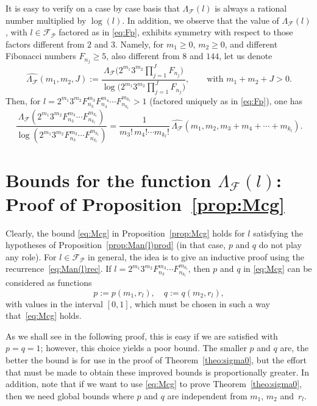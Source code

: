 \documentclass[11pt, a4paper]{article}
\newcommand{\manF}{\Lambda_{\mathcal{F}}}
\newcommand{\Fp}{\mathcal{F}_{\mathcal{P}}}
\theoremstyle{plain}
\theoremstyle{definition}
\begin{document}
It is easy to verify on a case by case basis that $\manF(l)$ is always a rational number multiplied by $\log(l)$. In addition, we observe that the value of $\manF(l)$, with $l \in \Fp$ factored as in \eqref{eq:Fp}, exhibits symmetry with respect to those factors different from $2$ and $3$. Namely, for $m_1 \ge 0$, $m_2 \ge 0$, and different Fibonacci numbers $F_{n_j}\ge 5$, also different from $8$ and $144$, let us denote
\begin{equation*}
\widehat{\manF}(m_1,m_2,J) := 
\frac{\manF\Big(2^{m_1} 3^{m_2} \prod_{j=1}^{J} F_{n_j}\Big)}
  {\log\Big(2^{m_1} 3^{m_2} \prod_{j=1}^{J} F_{n_j}\Big)},
\qquad\text{with } m_1+m_2+J>0.
\end{equation*}
Then, for $l=2^{m_1} 3^{m_2} F_{n_3}^{m_3} F_{n_4}^{m_4} \cdots F_{n_{k_l}}^{m_{k_l}} > 1$ (factored uniquely as in \eqref{eq:Fp}), one has
\[
  \frac{\manF(2^{m_1} 3^{m_2} F_{n_3}^{m_3} \cdots F_{n_{k_l}}^{m_{k_l}})}
    {\log(2^{m_1} 3^{m_2} F_{n_3}^{m_3} \cdots F_{n_{k_l}}^{m_{k_l}})}
  = \frac{1}{m_3!\,m_4!\cdots m_{k_l}!} 
  \, \widehat{\manF}(m_1,m_2,m_3+m_4+\cdots+m_{k_l}).
\]

\section{Bounds for the function $\manF(l)$: Proof of Proposition~\ref{prop:Mcg}}

Clearly, the bound \eqref{eq:Mcg} in Proposition~\ref{prop:Mcg} holds for $l$ satisfying the hypotheses of Proposition~\ref{prop:Man(l)prod} (in that case, $p$ and $q$ do not play any role). For $l \in \Fp$ in general, the idea is to give an inductive proof using the recurrence~\eqref{eq:Man(l)rec}. If $l = 2^{m_1}3^{m_2}F_{n_3}^{m_3} \cdots F_{n_{k_l}}^{m_{k_l}}$, then $p$ and $q$ in \eqref{eq:Mcg} can be considered as functions
\[
  p := p(m_1,r_l),\quad q := q(m_2,r_l),
\]
with values in the interval $[0,1]$, which must be chosen in such a way that~\eqref{eq:Mcg} holds.

As we shall see in the following proof, this is easy if we are satisfied with $p = q = 1$; however, this choice yields a poor bound. The smaller $p$ and $q$ are, the better the bound is for use in the proof of Theorem~\ref{theo:sigma0}, but the effort that must be made to obtain these improved bounds is proportionally greater. In addition, note that if we want to use \eqref{eq:Mcg} to prove Theorem~\ref{theo:sigma0}, then we need global bounds where $p$ and $q$ are independent from $m_1$, $m_2$ and~$r_l$.
\end{document}
